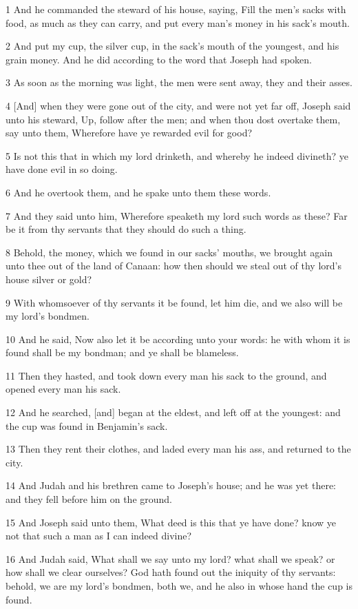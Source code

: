 \par 1 And he commanded the steward of his house, saying, Fill the men's sacks with food, as much as they can carry, and put every man's money in his sack's mouth.
\par 2 And put my cup, the silver cup, in the sack's mouth of the youngest, and his grain money. And he did according to the word that Joseph had spoken.
\par 3 As soon as the morning was light, the men were sent away, they and their asses.
\par 4 [And] when they were gone out of the city, and were not yet far off, Joseph said unto his steward, Up, follow after the men; and when thou dost overtake them, say unto them, Wherefore have ye rewarded evil for good?
\par 5 Is not this that in which my lord drinketh, and whereby he indeed divineth? ye have done evil in so doing.
\par 6 And he overtook them, and he spake unto them these words.
\par 7 And they said unto him, Wherefore speaketh my lord such words as these? Far be it from thy servants that they should do such a thing.
\par 8 Behold, the money, which we found in our sacks' mouths, we brought again unto thee out of the land of Canaan: how then should we steal out of thy lord's house silver or gold?
\par 9 With whomsoever of thy servants it be found, let him die, and we also will be my lord's bondmen.
\par 10 And he said, Now also let it be according unto your words: he with whom it is found shall be my bondman; and ye shall be blameless.
\par 11 Then they hasted, and took down every man his sack to the ground, and opened every man his sack.
\par 12 And he searched, [and] began at the eldest, and left off at the youngest: and the cup was found in Benjamin's sack.
\par 13 Then they rent their clothes, and laded every man his ass, and returned to the city.
\par 14 And Judah and his brethren came to Joseph's house; and he was yet there: and they fell before him on the ground.
\par 15 And Joseph said unto them, What deed is this that ye have done? know ye not that such a man as I can indeed divine?
\par 16 And Judah said, What shall we say unto my lord? what shall we speak? or how shall we clear ourselves? God hath found out the iniquity of thy servants: behold, we are my lord's bondmen, both we, and he also in whose hand the cup is found.
